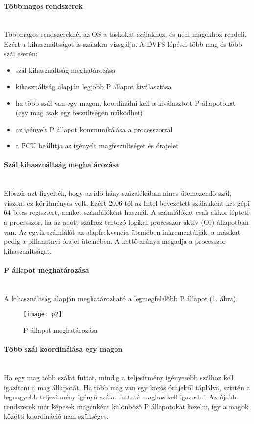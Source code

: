 \paragraph{Többmagos rendszerek}\mbox{}\\
Többmagos rendszereknél az OS a taskokat szálakhoz, és nem magokhoz rendeli.
Ezért a kihasználtságot is szálakra vizsgálja.
A DVFS lépései több mag és több szál esetén:
\begin{itemize}
    \item szál kihasználtság meghatározása
    \item kihasználtság alapján legjobb P állapot kiválasztása
    \item ha több szál van egy magon, koordinálni kell a kiválasztott P állapotokat (egy mag csak egy feszültségen működhet)
    \item az igényelt P állapot kommunikálása a processzorral
    \item a PCU beállítja az igényelt magfeszültséget és órajelet
\end{itemize}

\paragraph{Szál kihasználtság meghatározása}\mbox{}\\
Először azt figyelték, hogy az idő hány százalékában nincs ütemezendő szál, viszont ez körülményes volt.
Ezért 2006-tól az Intel bevezetett szálanként két gépi 64 bites regisztert, amiket számlálóként használ.
A számlálókat csak akkor lépteti a processzor, ha az adott szálhoz tartozó logikai processzor aktív (C0) állapotban van.
Az egyik számlálót az alapfrekvencia ütemében inkrementálják, a másikat pedig a pillanatnyi órajel ütemében.
A kettő aránya megadja a processzor kihasználtságát.

\paragraph{P állapot meghatározása}\mbox{}\\
A kihasználtság alapján meghatározható a legmegfelelőbb P állapot (\ref{fig:p2}. ábra).
\begin{figure}[H]
    \texttt{[image: p2]}
    \centering
    \caption{P állapot meghatározása}
    \label{fig:p2}
\end{figure}

\paragraph{Több szál koordinálása egy magon}\mbox{}\\
Ha egy mag több szálat futtat, mindig a teljesítmény igényesebb szálhoz kell igazítani a mag állapotát.
Ha több mag van egy közös órajelről táplálva, szintén a legnagyobb teljesítmény igényű szálat futtató maghoz kell igazodni.
Az újabb rendszerek már képesek magonként különböző P állapotokat kezelni, így a magok közötti koordináció nem szükséges.

